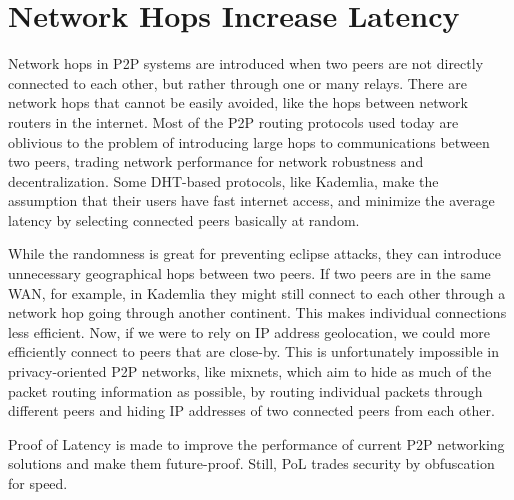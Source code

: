 
\section{Network Hops Increase Latency}
Network hops in P2P systems are introduced when two peers are not directly connected to each other, but rather through one or many relays. There are network hops that cannot be easily avoided, like the hops between network routers in the internet. Most of the P2P routing protocols used today are oblivious to the problem of introducing large hops to communications between two peers, trading network performance for network robustness and decentralization. Some DHT-based protocols, like Kademlia, make the assumption that their users have fast internet access, and minimize the average latency by selecting connected peers basically at random.

While the randomness is great for preventing eclipse attacks, they can introduce unnecessary geographical hops between two peers. If two peers are in the same WAN, for example, in Kademlia they might still connect to each other through a network hop going through another continent. This makes individual connections less efficient.
Now, if we were to rely on IP address geolocation, we could more efficiently connect to peers that are close-by. This is unfortunately impossible in privacy-oriented P2P networks, like mixnets, which aim to hide as much of the packet routing information as possible, by routing individual packets through different peers and hiding IP addresses of two connected peers from each other.~\cite{Harry_Halpin_undated-sq}

Proof of Latency is made to improve the performance of current P2P networking solutions and make them future-proof. Still, PoL trades security by obfuscation for speed.

